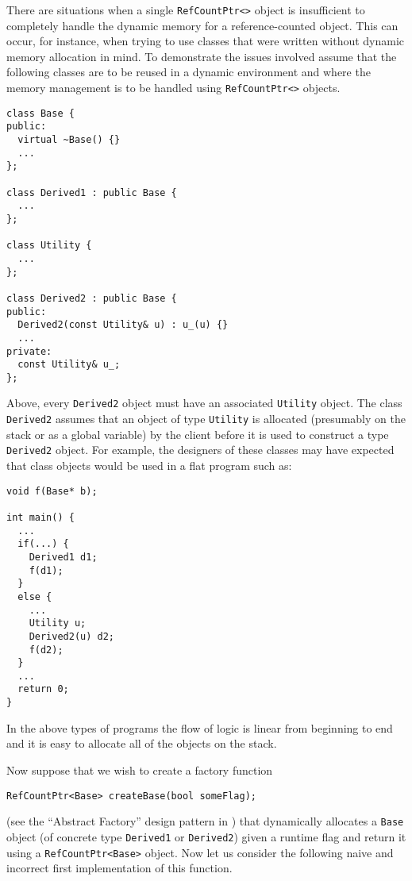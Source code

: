 There are situations when a single {}\texttt{RefCountPtr<>} object is
insufficient to completely handle the dynamic memory for a
reference-counted object.  This can occur, for instance, when trying
to use classes that were written without dynamic memory allocation in
mind.  To demonstrate the issues involved assume that the following
classes are to be reused in a dynamic environment and where the memory
management is to be handled using {}\texttt{RefCountPtr<>} objects.

{\scriptsize\begin{verbatim}
class Base {
public:
  virtual ~Base() {}
  ...
};

class Derived1 : public Base {
  ...
};

class Utility {
  ...
};

class Derived2 : public Base {
public:
  Derived2(const Utility& u) : u_(u) {}
  ...
private:
  const Utility& u_;
};
\end{verbatim}}

{}\noindent{}Above, every {}\texttt{Derived2} object must have an
associated {}\texttt{Utility} object.  The class {}\texttt{Derived2}
assumes that an object of type {}\texttt{Utility} is allocated
(presumably on the stack or as a global variable) by the client before
it is used to construct a type {}\texttt{Derived2} object.  For
example, the designers of these classes may have expected that class
objects would be used in a flat program such as:

{\scriptsize\begin{verbatim}
void f(Base* b);

int main() {
  ...
  if(...) {
    Derived1 d1;
    f(d1);
  }
  else {
    ...
    Utility u;
    Derived2(u) d2;
    f(d2);
  }
  ...
  return 0;
}
\end{verbatim}}

{}\noindent{}In the above types of programs the flow of logic is
linear from beginning to end and it is easy to allocate all of the
objects on the stack.

Now suppose that we wish to create a factory function

{\scriptsize\begin{verbatim}
RefCountPtr<Base> createBase(bool someFlag);
\end{verbatim}}

{}\indent{}(see the ``Abstract Factory'' design pattern in
{}\cite{ref:gama_et_al_1995}) that dynamically allocates a
{}\texttt{Base} object (of concrete type {}\texttt{Derived1} or
{}\texttt{Derived2}) given a runtime flag and return it using a
{}\texttt{RefCountPtr<Base>} object.  Now let us consider the
following naive and incorrect first implementation of this function.


